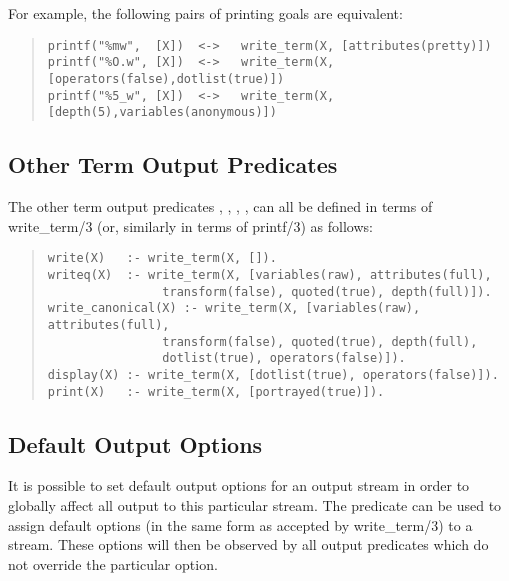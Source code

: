 For example, the following pairs of printing goals are equivalent:
\begin{quote}\begin{verbatim}
printf("%mw",  [X])  <->   write_term(X, [attributes(pretty)])
printf("%O.w", [X])  <->   write_term(X, [operators(false),dotlist(true)])
printf("%5_w", [X])  <->   write_term(X, [depth(5),variables(anonymous)])
\end{verbatim}\end{quote}


\subsection{Other Term Output Predicates}

The other term output predicates
,
,
,
,
can all be defined in terms of write_term/3 (or, similarly
in terms of printf/3) as follows:
\begin{quote}\begin{verbatim}
write(X)   :- write_term(X, []).
writeq(X)  :- write_term(X, [variables(raw), attributes(full),
                transform(false), quoted(true), depth(full)]).
write_canonical(X) :- write_term(X, [variables(raw), attributes(full),
                transform(false), quoted(true), depth(full),
                dotlist(true), operators(false)]).
display(X) :- write_term(X, [dotlist(true), operators(false)]).
print(X)   :- write_term(X, [portrayed(true)]).
\end{verbatim}\end{quote}


\subsection{Default Output Options}

It is possible to set default output options for an output stream
in order to globally affect all output to this particular stream.
The
predicate can be used to assign default options (in the same form as
accepted by write_term/3) to a stream.
These options will then be observed by all output predicates which do not
override the particular option.



